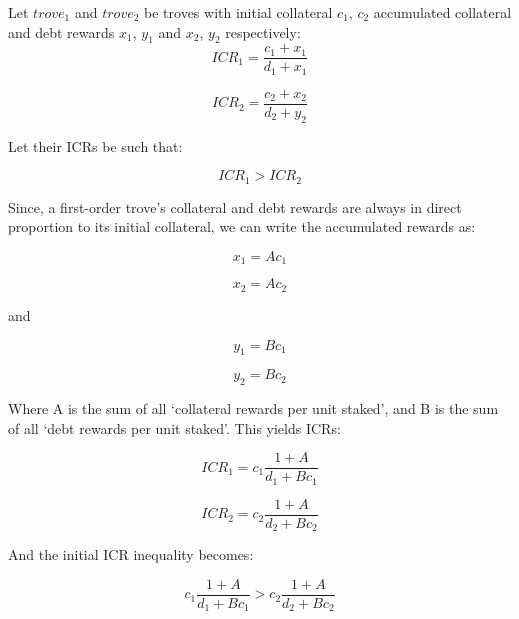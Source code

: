 \documentclass[reqno]{article}
\begin{document}
Let $trove_1$ and $trove_2$ be troves with initial collateral $c_1$, $c_2$ accumulated collateral and debt rewards $x_1$, $y_1$ and $x_2$, $y_2$ respectively:\\

\begin{equation} 
    ICR_1=\frac{c_1+x_1}{d_1+x_1}
\end{equation}

\begin{equation} 
    ICR_2=\frac{c_2+x_2}{d_2+y_2}
\end{equation}

Let their ICRs be such that:

\begin{equation} 
    ICR_1 > ICR_2
\end{equation}

\bigskip
Since, a first-order trove’s collateral and debt rewards are always in direct proportion to its initial collateral, we can write the accumulated rewards as:

\begin{equation} 
    x_1=Ac_1
\end{equation}

\begin{equation} 
    x_2=Ac_2
\end{equation}

and

\begin{equation} 
    y_1=Bc_1
\end{equation}

\begin{equation} 
    y_2=Bc_2
\end{equation}

\bigskip
Where A is the sum of all ‘collateral rewards per unit staked’, and B is the sum of all ‘debt rewards per unit staked’. This yields ICRs:

\begin{equation} 
    ICR_1=c_1\frac{1+A}{d_1+Bc_1}
\end{equation}

\begin{equation} 
    ICR_2=c_2\frac{1+A}{d_2+Bc_2}
\end{equation}

And the initial ICR inequality becomes:

\begin{equation} 
    c_1\frac{1+A}{d_1+Bc_1}>c_2\frac{1+A}{d_2+Bc_2}
\end{equation}
\end{document}
